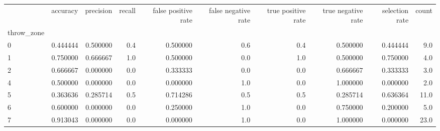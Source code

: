 \begin{tabular}{lrrrrrrrrr}
\toprule
{} &  accuracy &  precision &  recall &  false positive rate &  false negative rate &  true positive rate &  true negative rate &  selection rate &  count \\
throw\_zone &           &            &         &                      &                      &                     &                     &                 &        \\
\midrule
0          &  0.444444 &   0.500000 &     0.4 &             0.500000 &                  0.6 &                 0.4 &            0.500000 &        0.444444 &    9.0 \\
1          &  0.750000 &   0.666667 &     1.0 &             0.500000 &                  0.0 &                 1.0 &            0.500000 &        0.750000 &    4.0 \\
2          &  0.666667 &   0.000000 &     0.0 &             0.333333 &                  0.0 &                 0.0 &            0.666667 &        0.333333 &    3.0 \\
4          &  0.500000 &   0.000000 &     0.0 &             0.000000 &                  1.0 &                 0.0 &            1.000000 &        0.000000 &    2.0 \\
5          &  0.363636 &   0.285714 &     0.5 &             0.714286 &                  0.5 &                 0.5 &            0.285714 &        0.636364 &   11.0 \\
6          &  0.600000 &   0.000000 &     0.0 &             0.250000 &                  1.0 &                 0.0 &            0.750000 &        0.200000 &    5.0 \\
7          &  0.913043 &   0.000000 &     0.0 &             0.000000 &                  1.0 &                 0.0 &            1.000000 &        0.000000 &   23.0 \\
\bottomrule
\end{tabular}
